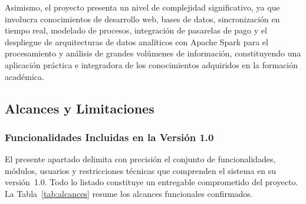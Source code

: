 Asimismo, el proyecto presenta un nivel de complejidad significativo, ya que involucra
conocimientos de desarrollo web, bases de datos, sincronizaci\'on en tiempo real, modelado de
procesos, integraci\'on de pasarelas de pago y el despliegue de arquitecturas de datos anal\'iticos con
Apache Spark para el procesamiento y an\'alisis de grandes vol\'umenes de
informaci\'on, constituyendo una aplicaci\'on pr\'actica e integradora de los
conocimientos adquiridos en la formaci\'on acad\'emica.

\subsection{Alcances y Limitaciones}

\subsubsection{Funcionalidades Incluidas en la Versión 1.0}

El presente apartado delimita con precisión el conjunto de funcionalidades, módulos,
usuarios y restricciones técnicas que comprenden el sistema en su versión~1.0.
Todo lo listado constituye un entregable comprometido del proyecto. La
Tabla~\ref{tab:alcances} resume los alcances funcionales confirmados.

